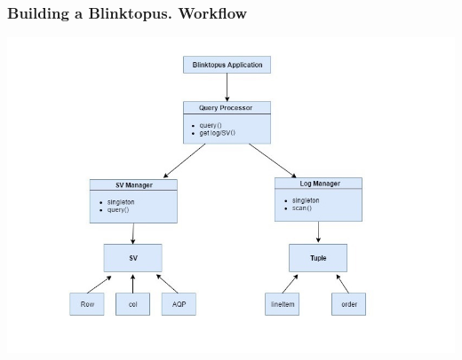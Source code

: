 \documentclass{beamer}
\begin{document}
\begin{frame}
\frametitle{Building a Blinktopus. Workflow}
\includegraphics[scale=0.5]{img/workflow.jpg}
\end{frame}
\end{document}
